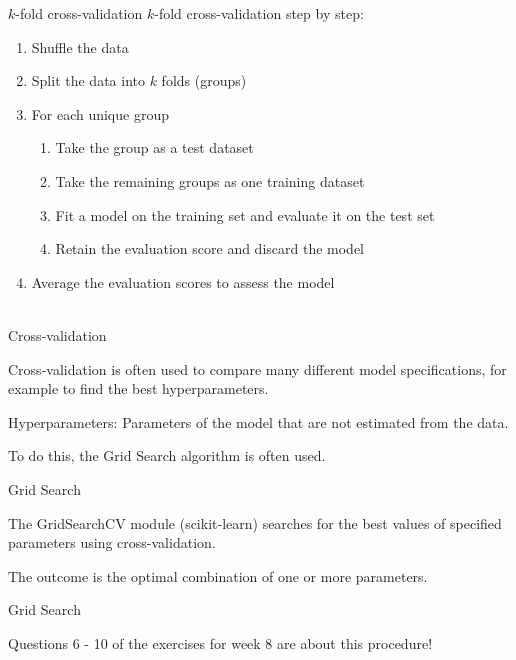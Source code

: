 \documentclass[handout]{beamer}
\begin{document}
\begin{frame}{\(k\)-fold cross-validation}
	\(k\)-fold cross-validation step by step:
	\begin{enumerate}
		\item Shuffle the data
		\item Split the data into \(k\) folds (groups)
		\item For each unique group
		\begin{enumerate}
			\item Take the group as a test dataset
			\item Take the remaining groups as one training dataset
			\item Fit a model on the training set and evaluate it on the test set
			\item Retain the evaluation score and discard the model
		\end{enumerate}
		\item Average the evaluation scores to assess the model \\\
	\end{enumerate}



\end{frame}
	

\begin{frame}{Cross-validation}
	
	Cross-validation is often used to compare many different model specifications, for example to find the best hyperparameters.
	
	Hyperparameters: Parameters of the model that are not estimated from the data. 
	
	To do this, the Grid Search algorithm is often used.
	
\end{frame}


\begin{frame}{Grid Search}
	
The GridSearchCV module (scikit-learn) searches for the best values of specified parameters using cross-validation.

The outcome is the optimal combination of one or more parameters.
	
\end{frame}


\begin{frame}{Grid Search}
	
Questions 6 - 10 of the exercises for week 8 are about this procedure!

\end{frame}
\end{document}
